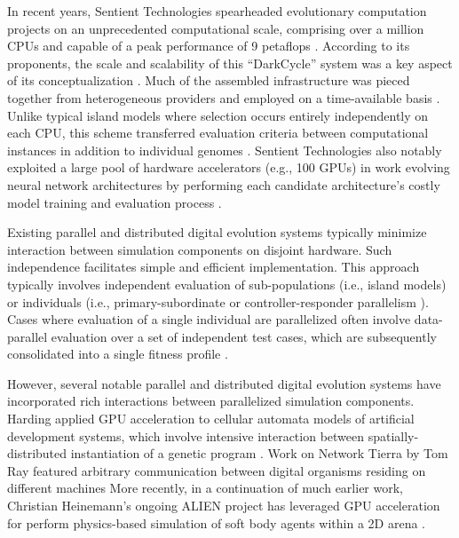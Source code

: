In recent years, Sentient Technologies spearheaded evolutionary computation projects on an unprecedented computational scale, comprising over a million CPUs and capable of a peak performance of 9 petaflops \citep{miikkulainen2019evolving}.
According to its proponents, the scale and scalability of this ``DarkCycle'' system was a key aspect of its conceptualization \citep{gilbert2015artificial}.
Much of the assembled infrastructure was pieced together from heterogeneous providers and employed on a time-available basis \citep{blondeau2009distributed}.
Unlike typical island models where selection occurs entirely independently on each CPU, this scheme transferred evaluation criteria between computational instances in addition to individual genomes \citep{hodjat2013distributed}.
Sentient Technologies also notably exploited a large pool of hardware accelerators (e.g., 100 GPUs) in work evolving neural network architectures by performing each candidate architecture's costly model training and evaluation process \citep{miikkulainen2019evolving}.

Existing parallel and distributed digital evolution systems typically minimize interaction between simulation components on disjoint hardware.
Such independence facilitates simple and efficient implementation.
This approach typically involves independent evaluation of sub-populations (i.e., island models) or individuals (i.e., primary-subordinate or controller-responder parallelism \citep{cantu2001master}).
Cases where evaluation of a single individual are parallelized often involve data-parallel evaluation over a set of independent test cases, which are subsequently consolidated into a single fitness profile \citep{harding2007fast_springer, langdon2019continuous}.

However, several notable parallel and distributed digital evolution systems have incorporated rich interactions between parallelized simulation components.
Harding applied GPU acceleration to cellular automata models of artificial development systems, which involve intensive interaction between spatially-distributed instantiation of a genetic program \citep{harding2007fast_ieee}.
Work on Network Tierra by Tom Ray featured arbitrary communication between digital organisms residing on different machines \citep{ray1995proposal}
More recently, in a continuation of much earlier work, Christian Heinemann's ongoing ALIEN project has leveraged GPU acceleration for perform physics-based simulation of soft body agents within a 2D arena \citep{heinemann2008artificial}.

